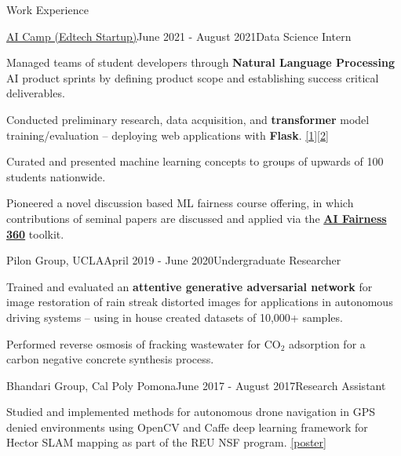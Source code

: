\documentclass{resume}
\begin{document}
\begin{rSection}{Work Experience}
    \begin{rSubsection}{\href{https://www.ai-camp.org/}{AI Camp (Edtech Startup)}}{June 2021 - August 2021}{Data Science Intern}
        \item Managed teams of student developers through \textbf{Natural Language Processing} AI product sprints by defining product scope and establishing success critical deliverables.
        \item Conducted preliminary research, data acquisition, and \textbf{transformer} model training/evaluation – deploying web applications with \textbf{Flask}. 
            \href{https://haiku-generator.ai-camp.org/}{[1]}\href{https://sentiment-text-generator.ai-camp.org/}{[2]}
        \item Curated and presented machine learning concepts to groups of upwards of 100 students nationwide.
        \item Pioneered a novel discussion based ML fairness course offering, in which contributions of seminal papers are discussed and applied via the \href{https://github.com/Trusted-AI/AIF360}{\bf AI Fairness 360} toolkit.
    \end{rSubsection}
    \begin{rSubsection}{Pilon Group, UCLA}{April 2019 - June 2020}{Undergraduate Researcher}
        \item Trained and evaluated an \textbf{attentive generative adversarial network} for image restoration of rain streak distorted
        images for applications in autonomous driving systems – using in house created datasets of 10,000+ samples.
        \item Performed reverse osmosis of fracking wastewater for $\text{CO}_2$ adsorption for a carbon negative concrete synthesis process.
    \end{rSubsection}
    \begin{rSubsection}{\small Bhandari Group, Cal Poly Pomona}{June 2017 - August 2017}{Research Assistant}
        \item Studied and implemented methods for autonomous drone navigation in GPS denied environments using OpenCV and Caffe deep learning framework for Hector SLAM mapping as part of the REU NSF program.
        \href{https://docs.google.com/presentation/d/1fp-MPZUgKS_PhMD90d4aL0Rh0-YfghnEYHb3sHKmnGE/edit?usp=sharing}{[poster]}
    \end{rSubsection}
\end{rSection}
\end{document}
